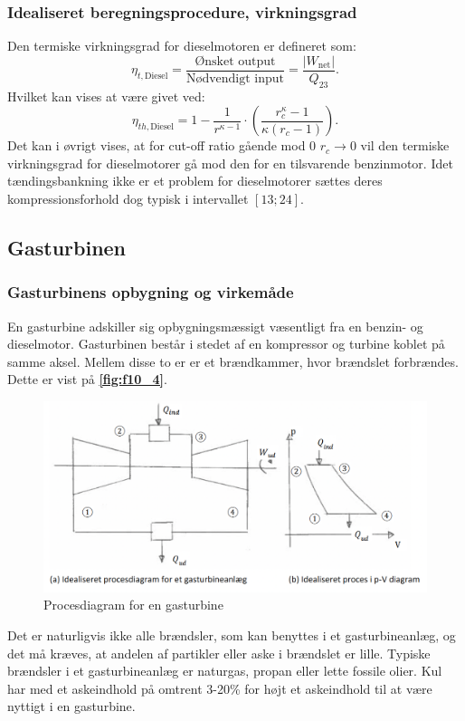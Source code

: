 \subsubsection{Idealiseret beregningsprocedure, virkningsgrad}
Den termiske virkningsgrad for dieselmotoren er defineret som:
\[ 
\eta_{t, \mathrm{Diesel}} = \frac{\text{Ønsket output}}{\text{Nødvendigt input}} = \frac{\left| W_{\mathrm{net}} \right|}{Q_{23}}
.\]
Hvilket kan vises at være givet ved:
\[ 
\eta_{th, \mathrm{Diesel}} = 1 - \frac{1}{r^{\kappa - 1}} \cdot \left( \frac{r_c^{\kappa} - 1}{\kappa \left( r_c - 1 \right) } \right)
.\]
Det kan i øvrigt vises, at for cut-off ratio gående mod 0 $r_c \to 0$ vil den termiske virkningsgrad for dieselmotorer gå mod den for en tilsvarende benzinmotor. Idet tændingsbankning ikke er et problem for dieselmotorer sættes deres kompressionsforhold dog typisk i intervallet $[13;24]$.


\subsection{Gasturbinen}

\subsubsection{Gasturbinens opbygning og virkemåde}
En gasturbine adskiller sig opbygningsmæssigt væsentligt fra en benzin- og dieselmotor. Gasturbinen består i stedet af en kompressor og turbine koblet på samme aksel. Mellem disse to er er et brændkammer, hvor brændslet forbrændes. Dette er vist på \textbf{\autoref{fig:f10_4}}.

\begin{figure} [ht]
  \centering
  \includegraphics[width=0.5\linewidth]{./figures/f10_4.png}
  \caption{Procesdiagram for en gasturbine}
  \label{fig:f10_4}
\end{figure}

Det er naturligvis ikke alle brændsler, som kan benyttes i et gasturbineanlæg, og det må kræves, at andelen af partikler eller aske i brændslet er lille. Typiske brændsler i et gasturbineanlæg er naturgas, propan eller lette fossile olier. Kul har med et askeindhold på omtrent 3-20\% for højt et askeindhold til at være nyttigt i en gasturbine.

